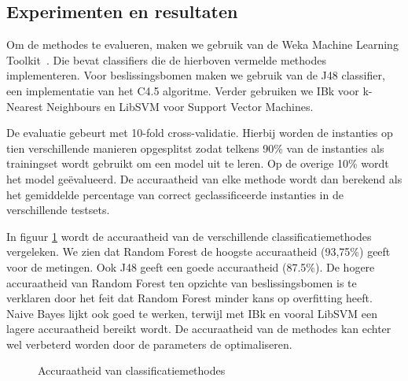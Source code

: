 \documentclass{article}
\begin{document}
\subsection{Experimenten en resultaten}
\label{afzonderlijk:experimenten}

Om de methodes te evalueren, maken we gebruik van de Weka Machine Learning Toolkit~\cite{waikato:weka}. %
Die bevat classifiers die de hierboven vermelde methodes implementeren. Voor beslissingsbomen maken we gebruik van de J48 classifier, een implementatie van het C4.5 algoritme. %
Verder gebruiken we IBk voor k-Nearest Neighbours en LibSVM voor Support Vector Machines.

De evaluatie gebeurt met 10-fold cross-validatie. Hierbij worden de instanties op tien verschillende manieren opgesplitst zodat telkens 90\% van de instanties als trainingset wordt gebruikt om een model uit te leren. Op de overige 10\% wordt het model ge\"evalueerd. De accuraatheid van elke methode wordt dan berekend als het gemiddelde percentage van correct geclassificeerde instanties in de verschillende testsets.

In figuur \ref{fig:methodes}
wordt de accuraatheid van de verschillende classificatiemethodes vergeleken. We zien dat Random Forest de hoogste accuraatheid (93,75\%) geeft voor de metingen. Ook J48 geeft een goede accuraatheid (87.5\%). De hogere accuraatheid van Random Forest ten opzichte van beslissingsbomen is te verklaren door het feit dat Random Forest minder kans op overfitting heeft.~\cite{breiman:randomforests} Naive Bayes lijkt ook goed te werken, terwijl met IBk en vooral LibSVM een lagere accuraatheid bereikt wordt. De accuraatheid van de methodes kan echter wel verbeterd worden door de parameters de optimaliseren.

\begin{figure}[h]
\centering
{}
\caption{Accuraatheid van classificatiemethodes}
\label{fig:methodes}
\end{figure}
\end{document}
